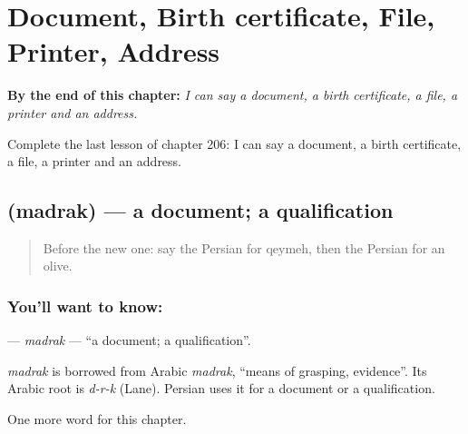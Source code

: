 
\chapter{Document, Birth certificate, File, Printer, Address}
\label{ch:fa-document-birth-certificate-file-printer-address}

\begin{chapteropening}
\textbf{By the end of this chapter:} \emph{I can say a document, a birth certificate, a file, a printer and an address.}

Complete the last lesson of chapter 206: I can say a document, a birth certificate, a file, a printer and an address.
\end{chapteropening}

\section[\texorpdfstring{\fa{مدرک} (madrak)}{مدرک (madrak)}]{ (madrak) — a document; a qualification}

\label{lesson:FA-C206-madrak}



\begin{quote}
Before the new one: say the Persian for qeymeh, then the Persian for an olive.
\end{quote}

\subsection*{You'll want to know: }
\textbf{} — \emph{madrak} — \textquotedblleft{}a document; a qualification\textquotedblright{}.

\begin{cousinweb}
\emph{madrak} is borrowed from Arabic \emph{madrak}, \textquotedblleft{}means of grasping, evidence\textquotedblright{}. Its Arabic root is \emph{d-r-k} (Lane). Persian uses it for a document or a qualification.
\end{cousinweb}

\begin{grammarlens}[title={What you've built}]
One more word for this chapter.
\end{grammarlens}

